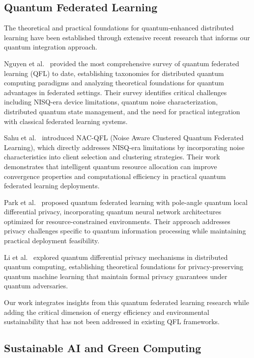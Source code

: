 \documentclass[10pt,journal,compsoc]{IEEEtran}
\begin{document}
\subsection{Quantum Federated Learning}

The theoretical and practical foundations for quantum-enhanced distributed learning have been established through extensive recent research that informs our quantum integration approach.

Nguyen et al.~\cite{Nguyen2024} provided the most comprehensive survey of quantum federated learning (QFL) to date, establishing taxonomies for distributed quantum computing paradigms and analyzing theoretical foundations for quantum advantages in federated settings. Their survey identifies critical challenges including NISQ-era device limitations, quantum noise characterization, distributed quantum state management, and the need for practical integration with classical federated learning systems.

Sahu et al.~\cite{Sahu2024} introduced NAC-QFL (Noise Aware Clustered Quantum Federated Learning), which directly addresses NISQ-era limitations by incorporating noise characteristics into client selection and clustering strategies. Their work demonstrates that intelligent quantum resource allocation can improve convergence properties and computational efficiency in practical quantum federated learning deployments.

Park et al.~\cite{Park2025} proposed quantum federated learning with pole-angle quantum local differential privacy, incorporating quantum neural network architectures optimized for resource-constrained environments. Their approach addresses privacy challenges specific to quantum information processing while maintaining practical deployment feasibility.

Li et al.~\cite{Li2024} explored quantum differential privacy mechanisms in distributed quantum computing, establishing theoretical foundations for privacy-preserving quantum machine learning that maintain formal privacy guarantees under quantum adversaries.

Our work integrates insights from this quantum federated learning research while adding the critical dimension of energy efficiency and environmental sustainability that has not been addressed in existing QFL frameworks.

\subsection{Sustainable AI and Green Computing}
\end{document}
